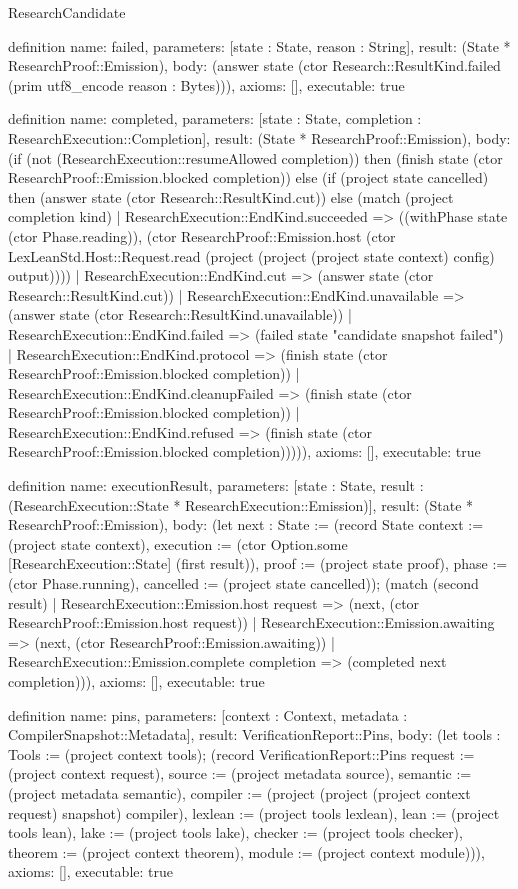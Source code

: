 \begin{lexlean}{ResearchCandidate}
\begin{semanticmodule}
definition{
 name: failed,
 parameters: [state : State, reason : String],
 result: (State * ResearchProof::Emission),
 body: (answer state (ctor Research::ResultKind.failed (prim utf8_encode reason : Bytes))),
 axioms: [],
 executable: true
}

definition{
 name: completed,
 parameters: [state : State, completion : ResearchExecution::Completion],
 result: (State * ResearchProof::Emission),
 body: (if (not (ResearchExecution::resumeAllowed completion)) then (finish state (ctor ResearchProof::Emission.blocked completion)) else (if (project state cancelled) then (answer state (ctor Research::ResultKind.cut)) else (match (project completion kind)
 | ResearchExecution::EndKind.succeeded => ((withPhase state (ctor Phase.reading)), (ctor ResearchProof::Emission.host (ctor LexLeanStd.Host::Request.read (project (project (project state context) config) output))))
 | ResearchExecution::EndKind.cut => (answer state (ctor Research::ResultKind.cut))
 | ResearchExecution::EndKind.unavailable => (answer state (ctor Research::ResultKind.unavailable))
 | ResearchExecution::EndKind.failed => (failed state "candidate snapshot failed")
 | ResearchExecution::EndKind.protocol => (finish state (ctor ResearchProof::Emission.blocked completion))
 | ResearchExecution::EndKind.cleanupFailed => (finish state (ctor ResearchProof::Emission.blocked completion))
 | ResearchExecution::EndKind.refused => (finish state (ctor ResearchProof::Emission.blocked completion))))),
 axioms: [],
 executable: true
}

definition{
 name: executionResult,
 parameters: [state : State, result : (ResearchExecution::State * ResearchExecution::Emission)],
 result: (State * ResearchProof::Emission),
 body: (let next : State := (record State {context := (project state context), execution := (ctor Option.some [ResearchExecution::State] (first result)), proof := (project state proof), phase := (ctor Phase.running), cancelled := (project state cancelled)}); (match (second result) | ResearchExecution::Emission.host request => (next, (ctor ResearchProof::Emission.host request)) | ResearchExecution::Emission.awaiting => (next, (ctor ResearchProof::Emission.awaiting)) | ResearchExecution::Emission.complete completion => (completed next completion))),
 axioms: [],
 executable: true
}

definition{
 name: pins,
 parameters: [context : Context, metadata : CompilerSnapshot::Metadata],
 result: VerificationReport::Pins,
 body: (let tools : Tools := (project context tools); (record VerificationReport::Pins {request := (project context request), source := (project metadata source), semantic := (project metadata semantic), compiler := (project (project (project context request) snapshot) compiler), lexlean := (project tools lexlean), lean := (project tools lean), lake := (project tools lake), checker := (project tools checker), theorem := (project context theorem), module := (project context module)})),
 axioms: [],
 executable: true
}


\end{semanticmodule}
\end{lexlean}
